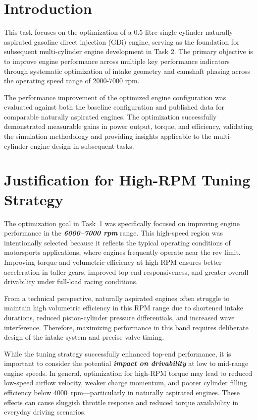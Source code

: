 \label{ch:task1}

\section{Introduction}

This task focuses on the optimization of a 0.5-litre single-cylinder naturally aspirated gasoline direct injection (GDi) engine, serving as the foundation for subsequent multi-cylinder engine development in Task 2. The primary objective is to improve engine performance across multiple key performance indicators through systematic optimization of intake geometry and camshaft phasing across the operating speed range of 2000-7000 rpm.

The performance improvement of the optimized engine configuration was evaluated against both the baseline configuration and published data for comparable naturally aspirated engines. The optimization successfully demonstrated measurable gains in power output, torque, and efficiency, validating the simulation methodology and providing insights applicable to the multi-cylinder engine design in subsequent tasks.

\section{Justification for High-RPM Tuning Strategy}

The optimization goal in Task~1 was specifically focused on improving engine performance in the \textbf{\textit{6000--7000 rpm}} range. This high-speed region was intentionally selected because it reflects the typical operating conditions of motorsports applications, where engines frequently operate near the rev limit. Improving torque and volumetric efficiency at high RPM ensures better acceleration in taller gears, improved top-end responsiveness, and greater overall drivability under full-load racing conditions.

From a technical perspective, naturally aspirated engines often struggle to maintain high volumetric efficiency in this RPM range due to shortened intake durations, reduced piston-cylinder pressure differentials, and increased wave interference. Therefore, maximizing performance in this band requires deliberate design of the intake system and precise valve timing.


While the tuning strategy successfully enhanced top-end performance, it is important to consider the potential \textbf{\textit{impact on drivability}} at low to mid-range engine speeds. In general, optimization for high-RPM torque may lead to reduced low-speed airflow velocity, weaker charge momentum, and poorer cylinder filling efficiency below 4000~rpm—particularly in naturally aspirated engines. These effects can cause sluggish throttle response and reduced torque availability in everyday driving scenarios.

